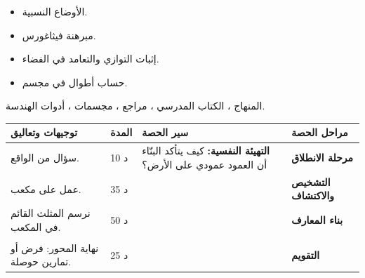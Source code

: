 \documentclass[12pt,a4paper]{article}
\newenvironment{LTR}{\begin{otherlanguage}{english}}{\end{otherlanguage}}
\newcommand{\ar}[1]{\foreignlanguage{arabic}{#1}}
\newcommand{\Phase}[1]{\textbf{#1}}
\newenvironment{Sayr}{%
\begin{LTR}\renewcommand{\arraystretch}{1.25}
\begin{longtable}{|p{0.17\textwidth}|>{\centering\arraybackslash}p{0.06\textwidth}|p{0.53\textwidth}|>{\centering\arraybackslash}p{0.12\textwidth}|}
\hline\rowcolor{cThm!12}\ar{\textbf{توجيهات وتعاليق}} & \ar{\textbf{المدة}} & \ar{\textbf{سير الحصة}} & \ar{\textbf{مراحل الحصة}}\\\hline\endhead
\hline\endfoot}{\end{longtable}\end{LTR}}
\newcommand{\Row}[4]{\ar{\small #4} & \ar{#3} & \ar{#2} & \cellcolor{cThm!8}\ar{\Phase{#1}}\\\hline}
\newcommand{\Lab}[2]{\foreignlanguage{english}{\tcbox[on line,colback=#1,colframe=#1,boxrule=0pt,arc=2pt,boxsep=1pt,left=5pt,right=5pt,top=1pt,bottom=1pt]{\ar{\textcolor{white}{\textbf{#2}}}}}}
\newcommand{\Num}[1]{\foreignlanguage{english}{\tikz[baseline=(c.base)]\node[fill=cDef,text=white,inner sep=2pt,font=\footnotesize\bfseries](c){#1};}}
\newcommand{\ck}{\ensuremath{{\color{cRem}\checkmark}}}
\begin{document}
{\begin{itemize}\item الأوضاع النسبية.\item مبرهنة فيثاغورس.\end{itemize}}%
{\begin{itemize}\item إثبات التوازي والتعامد في الفضاء.\item حساب أطوال في مجسم.\end{itemize}}%
{المنهاج ، الكتاب المدرسي ، مراجع ، مجسمات ، أدوات الهندسة.}
\begin{Sayr}
\Row{مرحلة الانطلاق}{%
\textbf{التهيئة النفسية:} كيف يتأكد البنّاء أن العمود عمودي على الأرض؟}{10 د}{سؤال من الواقع.}
\Row{التشخيص والاكتشاف}{%
\Lab{cEx}{وضعية مقترحة}\par في المكعب $ABCDEFGH$ الذي طول حرفه $a$: \Num{1} ما وضع $(AE)$ بالنسبة إلى $(AB)$ و $(AD)$ ؟ \Num{2} احسب $AC$ ثم $AG$.\par\ck\ $(AE)$ يعامد $(AB)$ و $(AD)$ المتقاطعين في المستوي $(ABCD)$ ، فهو عمودي على هذا المستوي.\par
\ck\ $AC=a\sqrt2$ ؛ و $(CG)\perp(ABCD)$ إذن المثلث $ACG$ قائم في $C$: $AG=\sqrt{2a^2+a^2}=a\sqrt3$.\par
}{35 د}{عمل على مكعب.}
\Row{بناء المعارف}{%
\Lab{cThm}{التعامد}\ يكون مستقيم عمودياً على مستوٍ إذا عامد مستقيمين متقاطعين منه ، وعندئذ يعامد كل مستقيمات هذا المستوي.\par\Lab{cThm}{التوازي}\par\ck\ مستقيمان موازيان لمستقيم ثالث متوازيان.\par
\ck\ يتوازى مستويان إذا وازى مستقيمان متقاطعان من أحدهما المستوي الآخر.\par
}{50 د}{نرسم المثلث القائم في المكعب.}
\Row{}{%
\Lab{cEx}{مثال}\ $(CG)\perp(ABCD)$ ، إذن $(CG)\perp(AC)$.\par\smallskip\begin{LTR}\centering\begin{tikzpicture}[scale=0.85,font=\scriptsize]
\coordinate (A) at (0,0); \coordinate (B) at (2,0); \coordinate (C) at (2.9,0.8); \coordinate (D) at (0.9,0.8);
\coordinate (E) at (0,2); \coordinate (F) at (2,2); \coordinate (G) at (2.9,2.8); \coordinate (H) at (0.9,2.8);
\draw[thick] (A)--(B)--(F)--(E)--cycle; \draw[thick] (B)--(C)--(G)--(F); \draw[thick] (E)--(H)--(G);
\draw[dashed] (A)--(D)--(C); \draw[dashed] (D)--(H);
\draw[cThm,thick] (A)--(G);
\foreach \p/\pos in {A/below left,B/below right,C/right,D/left,E/left,F/below right,G/above right,H/above left} \node[\pos] at (\p){$\p$};
\end{tikzpicture}\end{LTR}\par\Lab{cThm!80!black}{حذار}\ لا يكفي أن يعامد المستقيم مستقيماً واحداً من المستوي.}{}{}
\Row{التقويم}{%
\Lab{cEx}{تطبيق}\par مكعب طول حرفه $10$ cm: احسب $AC$ و $AG$ ، ثم حجم الهرم $GABCD$.\par\textbf{الحل:} $AC=10\sqrt2$ ؛ $AG=10\sqrt3$ ؛ $V=\dfrac13\times100\times10=\dfrac{1000}3$ cm³.\par\textbf{واجب منزلي:} تمارين حوصلة المحور من الكتاب المدرسي.\par\smallskip\textbf{ملاحظات حول سير الحصة:} \dotfill}{25 د}{نهاية المحور: فرض أو تمارين حوصلة.}
\end{Sayr}
\end{document}
